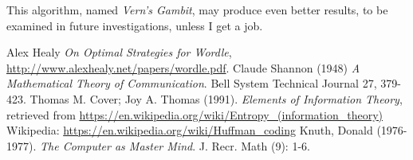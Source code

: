 \documentclass[11pt, oneside]{article} 	%
\begin{document}
This algorithm, named \emph{Vern's Gambit}, may produce even better results, to be examined in future investigations, unless I get a job.

\begin{thebibliography}{9}

Alex Healy \emph{On Optimal Strategies for Wordle}, \url{http://www.alexhealy.net/papers/wordle.pdf}.
Claude Shannon (1948) \emph{A Mathematical Theory of Communication}. Bell System Technical Journal 27, 379-423.
Thomas M. Cover; Joy A. Thomas (1991). \emph{Elements of Information Theory}, retrieved from \url{https://en.wikipedia.org/wiki/Entropy_(information_theory)}
Wikipedia: \url{https://en.wikipedia.org/wiki/Huffman_coding}
Knuth, Donald (1976-1977). \emph{The Computer as Master Mind}. J. Recr. Math (9): 1-6.
\end{thebibliography}
\end{document}

